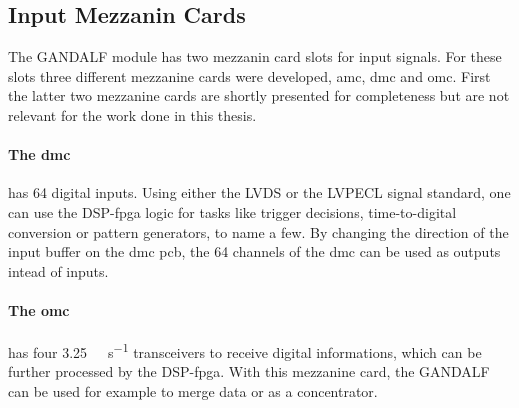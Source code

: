\subsection{Input Mezzanin Cards}
The GANDALF module has two mezzanin card slots for input signals.
For these slots three different mezzanine cards were developed, \ac{amc}, \ac{dmc} and \ac{omc}.
First the latter two mezzanine cards are shortly presented for completeness but are not relevant for the work done in this thesis.

\paragraph{The \ac{dmc}} has 64 digital inputs. 
Using either the LVDS or the LVPECL signal standard, one can use the DSP-\ac{fpga} logic for tasks like trigger decisions, time-to-digital conversion or pattern generators, to name a few.
By changing the direction of the input buffer on the \ac{dmc} \ac{pcb}, the 64 channels of the \ac{dmc} can be used as outputs intead of inputs.

\paragraph{The \ac{omc}} has four \SI{3.25}{\giga\bit\per\second} transceivers to receive digital informations, which can be further processed by the DSP-\ac{fpga}.
With this mezzanine card, the GANDALF can be used for example to merge data or as a concentrator.

